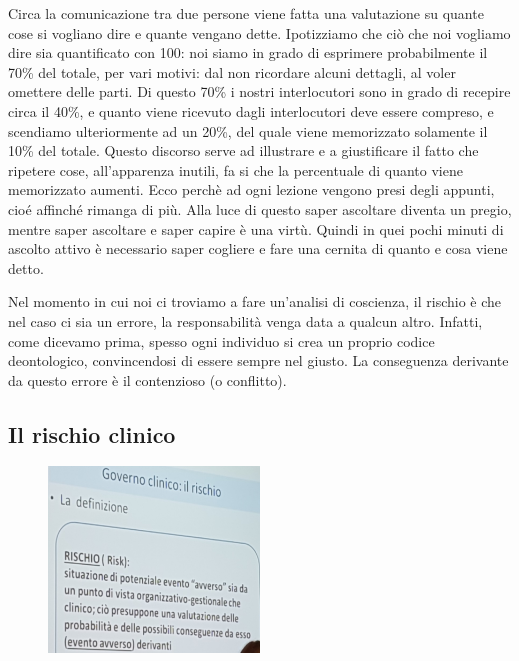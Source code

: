 Circa la comunicazione tra due persone viene fatta una valutazione su
quante cose si vogliano dire e quante vengano dette. Ipotizziamo che ciò
che noi vogliamo dire sia quantificato con 100: noi siamo in grado di
esprimere probabilmente il 70\% del totale, per vari motivi: dal non
ricordare alcuni dettagli, al voler omettere delle parti. Di questo 70\%
i nostri interlocutori sono in grado di recepire circa il 40\%, e quanto
viene ricevuto dagli interlocutori deve essere compreso, e scendiamo
ulteriormente ad un 20\%, del quale viene memorizzato solamente il 10\%
del totale. Questo discorso serve ad illustrare e a giustificare il
fatto che ripetere cose, all'apparenza inutili, fa si che la percentuale
di quanto viene memorizzato aumenti. Ecco perchè ad ogni lezione vengono
presi degli appunti, cioé affinché rimanga di più. Alla luce di questo
saper ascoltare diventa un pregio, mentre saper ascoltare e saper capire
è una virtù. Quindi in quei pochi minuti di ascolto attivo è necessario
saper cogliere e fare una cernita di quanto e cosa viene detto.

Nel momento in cui noi ci troviamo a fare un'analisi di coscienza, il
rischio è che nel caso ci sia un errore, la responsabilità venga data a
qualcun altro. Infatti, come dicevamo prima, spesso ogni individuo si
crea un proprio codice deontologico, convincendosi di essere sempre nel
giusto. La conseguenza derivante da questo errore è il contenzioso (o
conflitto).

\subsection{Il rischio clinico}

\begin{figure}[!ht]
\centering
	\includegraphics[width=0.5\textwidth]{29/image8.jpeg}
	\end{figure}

